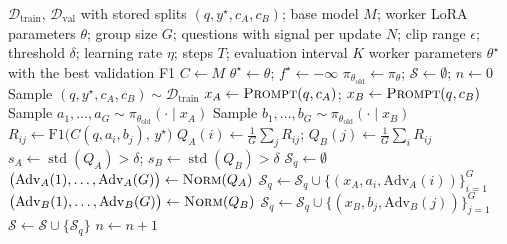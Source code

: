 \documentclass[11pt]{article}
\DeclareMathOperator{\stdev}{std}
\begin{document}
\begin{algorithm}[htbp]
\caption{Cross-paired GRPO-style training of the workers against a frozen synthesizer}
\label{alg:cross-grpo}
\begin{algorithmic}[1]
\Require $\mathcal{D}_{\mathrm{train}}$, $\mathcal{D}_{\mathrm{val}}$ with
  stored splits $(q, y^\star, c_A, c_B)$; base model $M$; worker LoRA
  parameters $\theta$; group size $G$; questions with signal per update $N$;
  clip range $\epsilon$; threshold $\delta$; learning rate $\eta$; steps $T$;
  evaluation interval $K$
\Ensure worker parameters $\theta^\star$ with the best validation F1
\State $C \gets M$
\State $\theta^\star \gets \theta$; \; $f^\star \gets -\infty$
  \State $\pi_{\theta_{\mathrm{old}}} \gets \pi_\theta$; \; $\mathcal{S} \gets \emptyset$; \; $n \gets 0$
   
    \State Sample $(q, y^\star, c_A, c_B) \sim \mathcal{D}_{\mathrm{train}}$
    \State $x_A \gets \textsc{Prompt}(q, c_A)$; \;
      $x_B \gets \textsc{Prompt}(q, c_B)$
    \State Sample $a_1, \dots, a_G \sim \pi_{\theta_{\mathrm{old}}}(\cdot \mid x_A)$
    \State Sample $b_1, \dots, b_G \sim \pi_{\theta_{\mathrm{old}}}(\cdot \mid x_B)$
      \State $R_{ij} \gets \mathrm{F1}\big(C(q, a_i, b_j),\, y^\star\big)$
    \EndFor
    \State $Q_A(i) \gets \frac{1}{G}\sum_{j} R_{ij}$; \;
      $Q_B(j) \gets \frac{1}{G}\sum_{i} R_{ij}$
    \State $s_A \gets \stdev(Q_A) > \delta$; \;
      $s_B \gets \stdev(Q_B) > \delta$
     
      \State $\mathcal{S}_q \gets \emptyset$
        \State $\big(\mathrm{Adv}_A(1), \dots, \mathrm{Adv}_A(G)\big) \gets \Call{Norm}{Q_A}$
        \State $\mathcal{S}_q \gets \mathcal{S}_q \cup \{(x_A, a_i, \mathrm{Adv}_A(i))\}_{i=1}^{G}$
      \EndIf
        \State $\big(\mathrm{Adv}_B(1), \dots, \mathrm{Adv}_B(G)\big) \gets \Call{Norm}{Q_B}$
        \State $\mathcal{S}_q \gets \mathcal{S}_q \cup \{(x_B, b_j, \mathrm{Adv}_B(j))\}_{j=1}^{G}$
      \EndIf
      \State $\mathcal{S} \gets \mathcal{S} \cup \{\mathcal{S}_q\}$
      \State $n \gets n + 1$ 

\end{algorithmic}
\end{algorithm}
\end{document}
